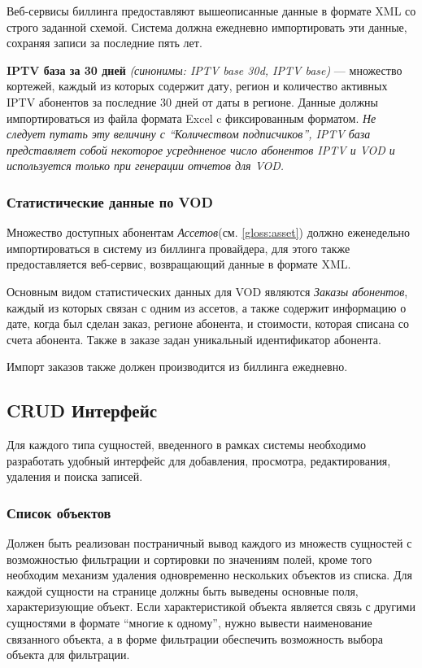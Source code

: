 Веб-сервисы биллинга предоставляют вышеописанные данные в формате XML со строго заданной схемой. Система должна ежедневно импортировать эти данные,
сохраняя записи за последние пять лет.

\textbf{IPTV база за 30 дней} \textit{(синонимы: IPTV base 30d, IPTV base)} --- множество кортежей, каждый из которых содержит дату,
регион и количество активных IPTV абонентов за последние 30 дней от даты в регионе. 
Данные должны импортироваться из файла формата Excel c фиксированным форматом.
\textit{Не следует путать эту величину с ``Количеством подписчиков'',  IPTV база представляет собой некоторое усреднненое число 
абонентов IPTV и VOD и используется только при генерации отчетов для VOD.}

\subsubsection{Статистические данные по VOD}
\label{stat:vod}
Множество доступных абонентам \textit{Ассетов}(см. \ref{gloss:asset}) должно еженедельно импортироваться в систему из 
биллинга провайдера, для этого также предоставляется веб-сервис, возвращающий данные в формате XML.

Основным видом статистических данных для VOD являются \textit{Заказы абонентов}, каждый из которых связан с одним из ассетов,
а также содержит информацию о дате, когда был сделан заказ, регионе абонента, и стоимости, которая списана со счета абонента.
Также в заказе задан уникальный идентификатор абонента.

Импорт заказов также должен производится из биллинга ежедневно.

\subsection{CRUD Интерфейс} 
Для каждого типа сущностей, введенного в рамках системы необходимо разработать удобный интерфейс для добавления, 
просмотра, редактирования, удаления и поиска записей.

\subsubsection{Список объектов}
\label{crud:list}
Должен быть реализован постраничный вывод каждого из множеств сущностей с возможностью фильтрации и сортировки
по значениям полей, кроме того необходим механизм удаления одновременно нескольких объектов из списка.
Для каждой сущности на странице должны быть выведены основные поля, характеризующие объект.
Если характеристикой объекта является связь с другими сущностями в формате ``многие к одному'',
нужно вывести наименование связанного объекта, а в форме фильтрации обеспечить возможность выбора объекта
для фильтрации. 

